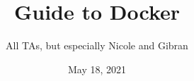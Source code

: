 \documentclass{article}
\title{Guide to Docker}
\author{All TAs, but especially Nicole and Gibran}
\date{May 18, 2021}
\begin{document}
\maketitle

\tableofcontents
\pagebreak



\end{document}
